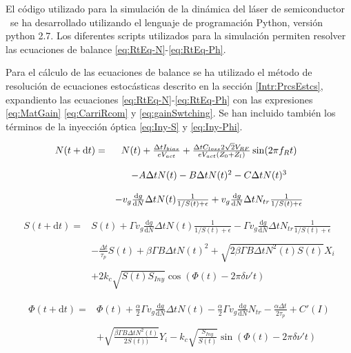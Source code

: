 El c\'odigo utilizado para la simulaci\'on de la din\'amica del l\'aser de semiconductor \gs\ se ha desarrollado utilizando el lenguaje de programaci\'on Python, versi\'on python 2.7. Los diferentes scripts utilizados para la simulaci\'on \cite{github} permiten resolver las ecuaciones de balance \ref{eq:RtEq-N}-\ref{eq:RtEq-Ph}.

Para el c\'alculo de las ecuaciones de balance se ha utilizado el m\'etodo de resoluci\'on de ecuaciones estoc\'asticas descrito en la secci\'on \ref{Intr:PrcsEstcs}, expandiento las ecuaciones \ref{eq:RtEq-N}-\ref{eq:RtEq-Ph} con las expresiones  \ref{eq:MatGain} \ref{eq:CarriRcom} y \ref{eq:gainSwtching}. Se han incluido tambi\'en los t\'erminos de la inyecci\'on \'optica \ref{eq:Iny-S} y \ref{eq:Iny-Phi}.

	\begin{equation}
		\begin{matrix}
			N(t + \mathrm{d}t) =  & N(t) + \frac{\Delta t I_{bias} }{e V_{act}} + \frac{\Delta t C_{loss} 2 \sqrt{2} V_{RF}}{eV_{act} (Z_0+Z_l)} \sin(2\pi f_R t) \\ \\
			 & - A\Delta t N(t) - B\Delta t N(t)^2 - C\Delta t N(t)^3 \\ \\
			 & - v_g \frac{\mathrm{d}g}{\mathrm{d}N} \Delta t N(t) \frac{1}{1/S(t) + \epsilon}  + v_g \frac{\mathrm{d}g}{\mathrm{d}N} \Delta t N_{tr} \frac{1}{1/S(t) + \epsilon}
		\end{matrix}
		\label{eq:Code-N}
	\end{equation}

	\begin{equation}
		\begin{matrix}
			S(t + \mathrm{d}t) =  & S(t) + \Gamma v_g \frac{\mathrm{d}g}{\mathrm{d}N} \Delta t N(t) \frac{1}{1/S(t) + \epsilon} - \Gamma v_g \frac{\mathrm{d}g}{\mathrm{d}N} \Delta t N_{tr} \frac{1}{1/S(t) + \epsilon} \\ \\
			 & - \frac{\Delta t}{\tau_p}S(t) + \beta\Gamma B\Delta t N(t)^2 + \sqrt{2 \beta \Gamma B \Delta tN^2(t)S(t)} X_i \\ \\
			 & + 2k_c\sqrt{S(t)S_{Iny}} \cos(\Phi(t) - 2\pi \delta\nu't)
		\end{matrix}
		\label{eq:Code-S}
	\end{equation}

	\begin{equation}
		\begin{matrix}
			\Phi(t + \mathrm{d}t) =  & \Phi(t) + \frac{\alpha}{2}\Gamma v_g \frac{\mathrm{d}g}{\mathrm{d}N} \Delta t N(t) - \frac{\alpha}{2}\Gamma v_g \frac{\mathrm{d} g}{\mathrm{d}N} N_{tr} - \frac{\alpha\Delta t}{2\tau_p} + C'(I) \\ \\
			 & + \sqrt{\frac{\beta \Gamma B \Delta t N^2(t)}{2 S(t))}} Y_i - k_c\sqrt{\frac{S_{Iny}}{S(t)}} \sin(\Phi(t) - 2\pi \delta\nu't)
		\end{matrix}
		\label{eq:Code-Ph}
	\end{equation}

